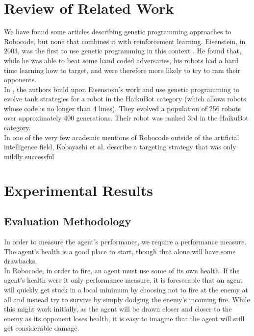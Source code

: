 \documentclass{article}
\theoremstyle{plain}
\theoremstyle{definition}
\theoremstyle{remark}
\begin{document}
\section{Review of Related Work}
We have found some articles describing genetic programming approaches to Robocode, but none that combines it with reinforcement learning. Eisenstein, in 2003, was the first to use genetic programming in this context \cite{gp2}. He found that, while he was able to beat some hand coded adversaries, his robots had a hard time learning how to target, and were therefore more likely to try to ram their opponents.\\

In \cite{gp1}, the authors build upon Eisenstein's work and use genetic programming to evolve tank strategies for a robot in the HaikuBot category (which allows robots whose code is no longer than 4 lines). They evolved a population of 256 robots over approximately 400 generations. Their robot was ranked 3rd in the HaikuBot category.\\

In one of the very few academic mentions of Robocode outside of the artificial intelligence field, Kobayashi et al. describe a targeting strategy that was only mildly successful \cite{strategies}

\section{Experimental Results}

\subsection*{Evaluation Methodology}
In order to measure the agent's performance, we require a performance measure. The agent's health is a good place to start, though that alone will have some drawbacks.\\

In Robocode, in order to fire, an agent must use some of its own health. If the agent's health were it only performance measure, it is foreseeable that an agent will quickly get stuck in a local minimum by choosing not to fire at the enemy at all and instead try to survive by simply dodging the enemy's incoming fire. While this might work initially, as the agent will be drawn closer and closer to the enemy as its opponent loses health, it is easy to imagine that the agent will still get considerable damage.\\
\end{document}
